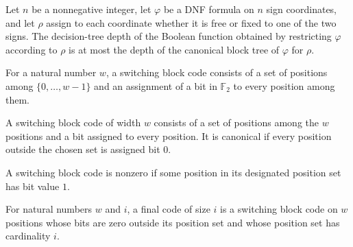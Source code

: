 \begin{theorem}
\label{FABL.DNFFormula.decisionTreeDepth_le_canonicalBlockTree_depth}
\leanok
{}
Let $n$ be a nonnegative integer, let $\varphi$ be a DNF formula on $n$ sign
coordinates, and let $\rho$ assign to each coordinate whether it is free or fixed to one
of the two signs. The decision-tree depth of the Boolean function obtained by
restricting $\varphi$ according to $\rho$ is at most the depth of the canonical block
tree of $\varphi$ for $\rho$.
\end{theorem}

\begin{definition}
\label{FABL.SwitchingBlockCode}
\leanok
{}
For a natural number $w$, a switching block code consists of a set of positions among
$\{0,\ldots,w-1\}$ and an assignment of a bit in $\mathbb{F}_2$ to every position among
them.
\end{definition}

\begin{definition}
\label{FABL.SwitchingBlockCode.Canonical}
\leanok
{}
A switching block code of width $w$ consists of a set of positions among the $w$
positions and a bit assigned to every position. It is canonical if every position
outside the chosen set is assigned bit $0$.
\end{definition}

\begin{definition}
\label{FABL.SwitchingBlockCode.Nonzero}
\leanok
{}
A switching block code is nonzero if some position in its designated position set has
bit value $1$.
\end{definition}

\begin{definition}
\label{FABL.SwitchingBlockCode.FinalOfSize}
\leanok
{}
For natural numbers $w$ and $i$, a final code of size $i$ is a switching block code on
$w$ positions whose bits are zero outside its position set and whose position set has
cardinality $i$.
\end{definition}

